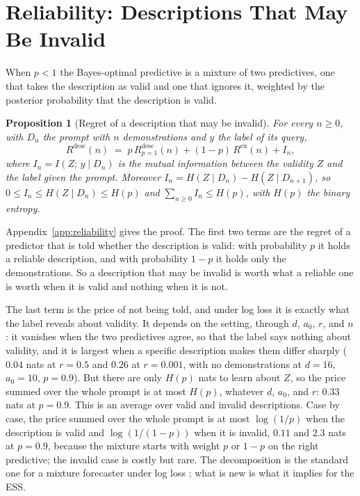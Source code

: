 \documentclass[10pt,twocolumn]{article}
\newtheorem{proposition}[theorem]{Proposition}
\begin{document}
\section{Reliability: Descriptions That May Be Invalid}\label{sec:reliability}
When $p < 1$ the Bayes-optimal predictive is a mixture of two predictives, one that takes the description as valid and one that ignores it, weighted by the posterior probability that the description is valid.

\begin{proposition}[Regret of a description that may be invalid]\label{prop:unreliable}
For every $n \ge 0$, with $D_n$ the prompt with $n$ demonstrations and $y$ the label of its query,
\begin{equation}\label{eq:decomp}
    R^{\mathrm{desc}}(n) \;=\; p\, R^{\mathrm{desc}}_{p=1}(n) + (1-p)\, R^{\mathrm{ex}}(n) + I_n,
\end{equation}
where $I_n = I(Z;\, y \mid D_n)$ is the mutual information between the validity $Z$ and the label given the prompt. Moreover $I_n = H(Z \mid D_n) - H(Z \mid D_{n+1})$, so $0 \le I_n \le H(Z \mid D_n) \le H(p)$ and $\sum_{n \ge 0} I_n \le H(p)$, with $H(p)$ the binary entropy.
\end{proposition}
Appendix~\ref{app:reliability} gives the proof. The first two terms are the regret of a predictor that is told whether the description is valid: with probability $p$ it holds a reliable description, and with probability $1-p$ it holds only the demonstrations. So a description that may be invalid is worth what a reliable one is worth when it is valid and nothing when it is not.

The last term is the price of not being told, and under log loss it is exactly what the label reveals about validity. It depends on the setting, through $d$, $a_0$, $r$, and $n$: it vanishes when the two predictives agree, so that the label says nothing about validity, and it is largest when a specific description makes them differ sharply ($0.04$ nats at $r = 0.5$ and $0.26$ at $r = 0.001$, with no demonstrations at $d = 16$, $a_0 = 10$, $p = 0.9$). But there are only $H(p)$ nats to learn about $Z$, so the price summed over the whole prompt is at most $H(p)$, whatever $d$, $a_0$, and $r$: $0.33$ nats at $p = 0.9$. This is an average over valid and invalid descriptions. Case by case, the price summed over the whole prompt is at most $\log(1/p)$ when the description is valid and $\log(1/(1-p))$ when it is invalid, $0.11$ and $2.3$ nats at $p = 0.9$, because the mixture starts with weight $p$ or $1-p$ on the right predictive; the invalid case is costly but rare. The decomposition is the standard one for a mixture forecaster under log loss \citep{cesabianchi2006, merhav1998}; what is new is what it implies for the ESS.
\end{document}
